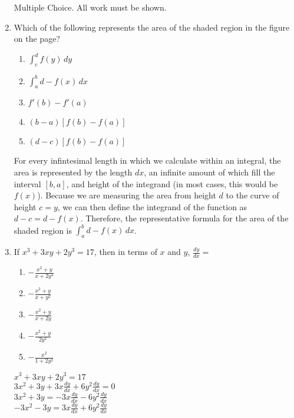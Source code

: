 \documentclass[10pt, letterpaper]{report}
\begin{document}
\begin{enumerate}
    \pagebreak
  Multiple Choice. All work must be shown.
  \item{Which of the following represents the area of the shaded region in the figure on the page?} \\
    \begin{enumerate}
      \item{$\int_{c}^{d}{f(y)}\,dy$}
      \item{$\int_{a}^{b}{d-f(x)}\,dx$}
      \item{$f'(b)-f'(a)$}
      \item{$(b-a)[f(b)-f(a)]$}
      \item{$(d-c)[f(b)-f(a)]$}
    \end{enumerate}

    For every infintesimal length in which we calculate within an integral, the area is represented by the length $dx$, an infinite amount of which fill the interval $[b,a]$, and height of the integrand (in most cases, this would be $f(x)$). Because we are measuring the area from height $d$ to the curve of height $c=y$, we can then define the integrand of the function as $d-c=d-f(x)$. Therefore, the representative formula for the area of the shaded region is $\int_{a}^{b}{d-f(x)}\,dx$. \\

    \hline
  \item{If $x^{3}+3xy+2y^{3}=17$, then in terms of $x$ and $y$, $\frac{dy}{dx}=$} \\
    \begin{enumerate}
      \item{$-\frac{x^{2}+y}{x+2y^{2}}$}
      \item{$-\frac{x^{2}+y}{x+y^{2}}$}
      \item{$-\frac{x^{2}+y}{x+2y}$}
      \item{$-\frac{x^{2}+y}{2y^{2}}$}
      \item{$-\frac{x^{2}}{1+2y^{2}}$}
    \end{enumerate}

    $x^{3}+3xy+2y^{3}=17$ \\

    $3x^{2}+3y+3x\frac{dy}{dx}+6y^{2}\frac{dy}{dx}=0$ \\

    $3x^{2}+3y=-3x\frac{dy}{dx}-6y^{2}\frac{dy}{dx}$ \\

    $-3x^{2}-3y=3x\frac{dy}{dx}+6y^{2}\frac{dy}{dx}$ \\


\end{enumerate}
\end{document}
